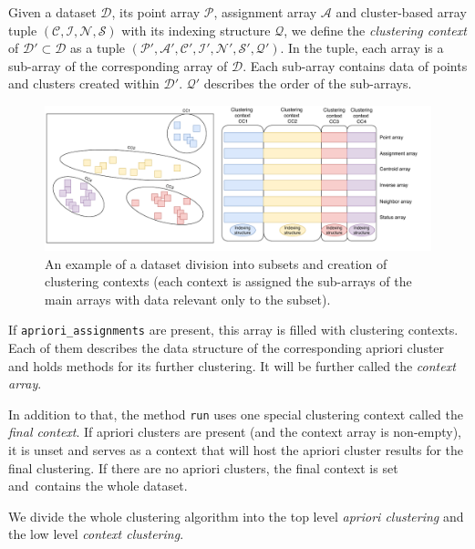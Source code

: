 \begin{defn}
	Given a dataset $\mathcal{D}$, its point array $\mathcal{P}$, assignment array $\mathcal{A}$ and cluster-based array tuple $(\mathcal{C},\mathcal{I},\mathcal{N},\mathcal{S})$ with its indexing structure $\mathcal{Q}$, we define the \emph{clustering context} of $\mathcal{D}' \subset \mathcal{D}$ as a tuple $(\mathcal{P'},\mathcal{A'},\mathcal{C'},\mathcal{I'},\mathcal{N'},\mathcal{S'},\mathcal{Q}')$. In the tuple, each array is a sub-array of the corresponding array of $\mathcal{D}$. Each sub-array contains data of points and clusters created within $\mathcal{D}'$. $\mathcal{Q}'$ describes the order of the sub-arrays.
	\label{def03:context}
\end{defn}

\begin{figure}\centering
	\includegraphics[width=\linewidth]{img/clustering_context}
	\caption{An example of a dataset division into subsets and creation of clustering contexts (each context is assigned the sub-arrays of the main arrays with data relevant only to the subset).}
	\label{fig03:clust_ctx}
\end{figure}

 If \texttt{apriori\_assignments} are present, this array is filled with clustering contexts. Each of them describes the data structure of the corresponding apriori cluster and holds methods for its further clustering. It will be further called the \emph{context array}. 

In addition to that, the method \texttt{run} uses one special clustering context called the \emph{final context}. If apriori clusters are present (and the context array is non-empty), it is unset and serves as a context that will host the apriori cluster results for the final clustering. If there are no apriori clusters, the final context is set and~contains the whole dataset.

We divide the whole clustering algorithm into the top level \emph{apriori clustering} and the low level \emph{context clustering}.

